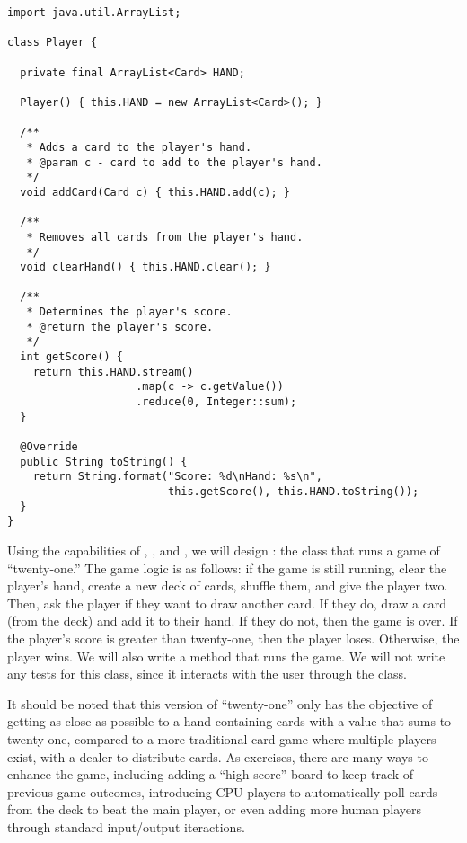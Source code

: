 \begin{lstlisting}[language=MyJava]
import java.util.ArrayList;

class Player {

  private final ArrayList<Card> HAND;

  Player() { this.HAND = new ArrayList<Card>(); }

  /**
   * Adds a card to the player's hand.
   * @param c - card to add to the player's hand.
   */
  void addCard(Card c) { this.HAND.add(c); }

  /**
   * Removes all cards from the player's hand.
   */
  void clearHand() { this.HAND.clear(); }

  /**
   * Determines the player's score.
   * @return the player's score.
   */
  int getScore() {
    return this.HAND.stream()
                    .map(c -> c.getValue())
                    .reduce(0, Integer::sum);
  }

  @Override
  public String toString() {
    return String.format("Score: %d\nHand: %s\n", 
                         this.getScore(), this.HAND.toString());
  }
}
\end{lstlisting}

Using the capabilities of , , and , we will design : the class that runs a game of ``twenty-one.'' 
The game logic is as follows: if the game is still running, clear the player's hand, create a new deck of cards, shuffle them, and give the player two. 
Then, ask the player if they want to draw another card. 
If they do, draw a card (from the deck) and add it to their hand. 
If they do not, then the game is over. 
If the player's score is greater than twenty-one, then the player loses. Otherwise, the player wins. 
We will also write a  method that runs the game. 
We will not write any tests for this class, since it interacts with the user through the  class.

It should be noted that this version of ``twenty-one'' only has the objective of getting as close as possible to a hand containing cards with a value that sums to twenty one, compared to a more traditional card game where multiple players exist, with a dealer to distribute cards. 
As exercises, there are many ways to enhance the game, including adding a ``high score'' board to keep track of previous game outcomes, introducing CPU players to automatically poll cards from the deck to beat the main player, or even adding more human players through standard input/output iteractions. 

